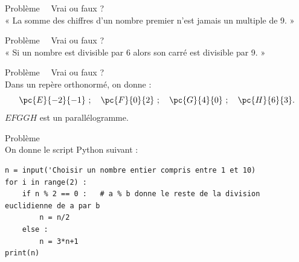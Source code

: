 \documentclass[a4paper, landscape,11pt,exos]{nsi} %
\newcounter{pbNum}
\newcommand{\pb}[1]
{
	\addtocounter{pbNum}{1}
	{\titlefont\color{UGLiBlue}\Large Problème\ \thepbNum\ \normalsize{#1}}\smallskip	
}
\begin{document}
\begin{multicols}{2}
    \newpage

    \maketitle

    \pb{ Vrai ou faux ?}\\
    « La somme des chiffres d’un nombre premier n’est jamais un multiple de 9. »\\
    \vfill\null
    \columnbreak

    \maketitle

    \pb{ Vrai ou faux ?}\\
    « Si un nombre est divisible par 6 alors son carré est divisible par 9. »\\

    \newpage

    \maketitle


    \pb{ Vrai ou faux ?}\\
    Dans un repère orthonormé, on donne :
    $$\pc{E}{-2}{-1}\ ;\quad \pc{F}{0}{2}\ ;\quad \pc{G}{4}{0}\ ;\quad \pc{H}{6}{3}.$$
    $EFGGH$ est un parallélogramme.\\
    \vfill\null
    \columnbreak

    \maketitle

    \pb{}\\
    On donne le script Python suivant :
    \begin{pyc}
        \begin{verbatim}
n = input('Choisir un nombre entier compris entre 1 et 10)
for i in range(2) :
    if n % 2 == 0 :   # a % b donne le reste de la division euclidienne de a par b
        n = n/2
    else :
        n = 3*n+1
print(n)
        \end{verbatim}
    \end{pyc}


\end{multicols}
\end{document}

